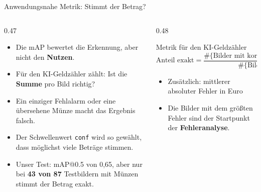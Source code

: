 \begin{frame}{Anwendungsnahe Metrik: Stimmt der Betrag?}
\footnotesize
{}
\begin{columns}
\begin{column}{0.47\textwidth}
\begin{itemize}
  \item Die mAP bewertet die Erkennung, aber nicht den \textbf{Nutzen}.
  \item Für den KI-Geldzähler zählt: Ist die \textbf{Summe} pro Bild richtig?
  \item Ein einziger Fehlalarm oder eine übersehene Münze macht das Ergebnis falsch.
  \item Der Schwellenwert \texttt{conf} wird so gewählt, dass möglichst viele Beträge stimmen.
  \item Unser Test: mAP@0.5 von 0,65, aber nur bei \textbf{43 von 87} Testbildern mit Münzen stimmt der Betrag exakt.
\end{itemize}
\end{column}
\begin{column}{0.48\textwidth}
\begin{blockC3}{Metrik für den KI-Geldzähler}
\[
\text{Anteil exakt} = \frac{\#\{\text{Bilder mit korrekter Summe}\}}{\#\{\text{Bilder}\}}
\]
\end{blockC3}
\begin{itemize}
  \item Zusätzlich: mittlerer absoluter Fehler in Euro
  \item Die Bilder mit dem größten Fehler sind der Startpunkt der \textbf{Fehleranalyse}.
\end{itemize}
\end{column}
\end{columns}
\end{frame}

